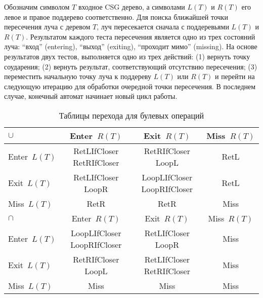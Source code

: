 Обозначим символом $T$ входное CSG дерево, а символами $L(T)$ и $R(T)$ его левое и правое поддерево соответственно. Для поиска ближайшей точки пересечения луча с деревом $T$, луч пересекается сначала с поддеревьями $L(T)$ и $R(T)$. Результатом каждого теста пересечения является одно из трех состояний луча: “вход” (entering), “выход” (exiting), “проходит мимо” (missing). На основе результатов двух  тестов, выполняется одно из трех действий: (1) вернуть точку соударения; (2) вернуть результат, соответствующий отсутствию пересечения; (3) переместить начальную точку луча к поддереву $L(T)$ или $R(T)$ и перейти на следующую итерацию для обработки очередной точки пересечения. В последнем случае, конечный автомат начинает новый цикл работы.

\begin{table} [ht]
    \caption{Таблицы перехода для булевых операций}
    \label{tbl:jump_table}
    \begin{SingleSpace}
    \setlength\extrarowheight{5pt} %
    \setlength{\tymin}{1.9cm}%
    \begin{tabulary}{\textwidth}{@{}>{\zz}L >{\zz}C >{\zz}C >{\zz}C@{}}%
        \toprule
        $\cup$       & Enter~$R(T)$                  & Exit~$R(T)$            & Miss~$R(T)$ \\
        \midrule
        Enter~$L(T)$ & RetLIfCloser \linebreak RetRIfCloser     & RetRIfCloser \linebreak LoopL & RetL \\
        Exit~$L(T)$  & RetLIfCloser \linebreak LoopR & LoopLIfCloser \linebreak LoopRIfCloser   & RetL \\
        Miss~$L(T)$  & RetR                          & RetR                          & Miss \\

        \toprule
        $\cap$       & Enter~$R(T)$                  & Exit~$R(T)$            & Miss~$R(T)$ \\
        \midrule
        Enter~$L(T)$ & LoopLIfCloser \linebreak LoopRIfCloser   & RetLIfCloser \linebreak LoopR & Miss \\
        Exit~$L(T)$  & RetRIfCloser \linebreak LoopL & RetLIfCloser \linebreak RetRIfCloser     & Miss \\
        Miss~$L(T)$  & Miss                          & Miss                          & Miss \\


\end{tabulary}
\end{SingleSpace}
\end{table}

